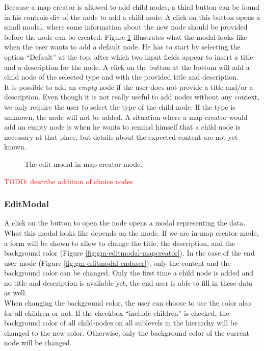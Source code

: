 Because a map creator is allowed to add child nodes, a third button can be found in his controls-div of the node to add a child node. A click on this button opens a small modal, where some information about the new node should be provided before the node can be created. Figure \ref{fig:gm-add-default} illustrates what the modal looks like when the user wants to add a default node. He has to start by selecting the option ``Default'' at the top, after which two input fields appear to insert a title and a description for the node. A click on the button at the bottom will add a child node of the selected type and with the provided title and description.\\

It is possible to add an \textit{empty} node if the user does not provide a title and/or a description. Even though it is not really useful to add nodes without any context, we only require the user to select the type of the child node. If the type is unknown, the node will not be added. A situation where a map creator would add an empty node is when he wants to remind himself that a child node is necessary at that place, but details about the expected content are not yet known.

\begin{figure}[H]
	\centering
	\caption{The edit modal in map creator mode.}
	\label{fig:gm-add-default}
\end{figure}

\textcolor{red}{TODO: describe addition of choice nodes}



\subsubsection{EditModal}\label{sec:editmodal}
A click on the button to open the node opens a modal representing the data. What this modal looks like depends on the mode. If we are in map creator mode, a form will be shown to allow to change the title, the description, and the background color (Figure \ref{fig:gm-editmodal-mapcreator}). In the case of the end user mode (Figure \ref{fig:gm-editmodal-enduser}), only the content and the background color can be changed. Only the first time a child node is added and no title and description is available yet, the end user is able to fill in these data as well.\\

When changing the background color, the user can choose to use the color also for all children or not. If the checkbox ``include children'' is checked, the background color of all child-nodes on all sublevels in the hierarchy will be changed to the new color. Otherwise, only the background color of the current node will be changed.\\

